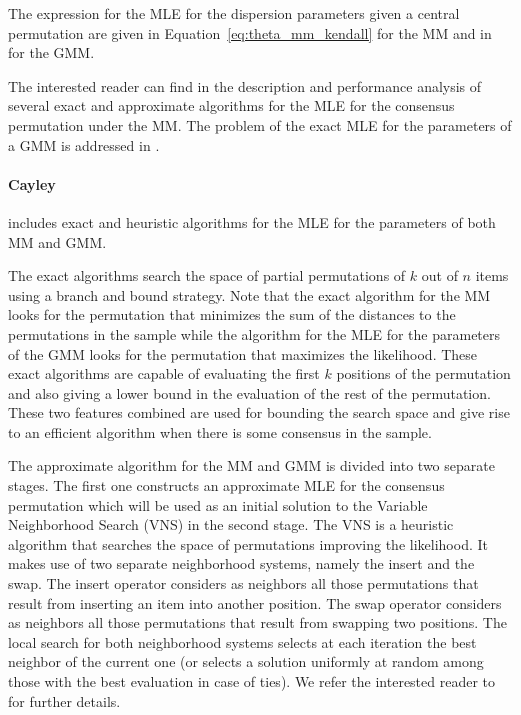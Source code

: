 \documentclass[article,nojss]{jss}
\begin{document}
The expression for the MLE for the dispersion parameters given a central permutation are given in Equation~\eqref{eq:theta_mm_kendall} for the MM and in \cite{Mandhani2009} for the GMM. 

The interested reader can find in \cite{Ali2011} the description and performance analysis of several exact and approximate algorithms for the MLE for the consensus permutation under the MM. The problem of the exact MLE for the parameters of a GMM is addressed in  \cite{Mandhani2009}. 

\paragraph{Cayley}
 includes exact and heuristic algorithms for the MLE for the parameters of both MM and GMM. 

The exact algorithms search the space of partial  permutations of $k$ out of $n$ items using a branch and bound strategy. Note that the exact algorithm for the MM looks for the permutation that minimizes the sum of the distances to the permutations in the sample while the algorithm for the MLE for the parameters of the GMM looks for the permutation that maximizes the likelihood. These exact algorithms are capable of evaluating the first $k$ positions of the permutation and also giving a lower bound in the evaluation of the rest of the permutation. These two features combined are used for bounding the search space and give rise to an efficient algorithm when there is some consensus in the sample. 

The approximate algorithm for the MM and GMM is divided into two separate stages. The first one constructs an approximate MLE for the consensus permutation which will be used as an initial solution to the Variable Neighborhood Search (VNS) in the second stage. The VNS is a heuristic algorithm that searches the space of permutations improving the likelihood. It makes use of two separate neighborhood systems, namely the insert and the swap. The insert operator considers as neighbors all those permutations that result from inserting an item into another position. The swap operator considers as neighbors all those permutations that result from swapping two positions. The local search for both neighborhood systems selects at each iteration the best neighbor of the current one (or selects a solution uniformly at random among those with the best evaluation in case of ties). We refer the interested reader to \cite{Irurozki2014b} for further details. 
\end{document}
